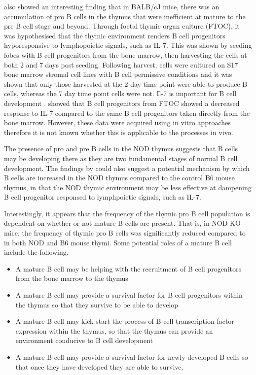 \citet{Hashimoto2002} also showed an interesting finding that in BALB/cJ mice, there was an accumulation of pro B cells in the thymus that were inefficient at mature to the pre B cell stage and beyond.
Through foetal thymic organ culture (FTOC), it was hypothesised that the thymic environment renders B cell progenitors hyporesponsive to lymphopoietic signals, such as IL-7.
This was shown by seeding lobes with B cell progenitors from the bone marrow, then harvesting the cells at both 2 and 7 days post seeding.
Following harvest, cells were cultured on S17 bone marrow stromal cell lines with B cell permissive conditions and it was shown that only those harvested at the 2 day time point were able to produce B cells, whereas the 7 day time point cells were not.
Il-7 is important for B cell development \citep{Corfe2012}. \citet{Hashimoto2002} showed that B cell progenitors from FTOC showed a decreased response to IL-7 compared to the same B cell progenitors taken directly from the bone marrow.
However, these data were acquired using in vitro approaches therefore it is not known whether this is applicable to the processes in vivo.

The presence of pro and pre B cells in the NOD thymus suggests that B cells may be developing there as they are two fundamental stages of normal B cell development.
The findings by \citet{Hashimoto2002} could also suggest a potential mechanism by which B cells are increased in the NOD thymus compared to the control B6 mouse thymus, in that the NOD thymic environment may be less effective at dampening B cell progenitor responsed to lymphpoietic signals, such as IL-7.

Interestingly, it appears that the frequency of the thymic pro B cell population is dependent on whether or not mature B cells are present.
That is, in NOD KO mice, the frequency of thymic pro B cells was significantly reduced compared to in both NOD and B6 mouse thymi.
Some potential roles of a mature B cell include the following.
\begin{itemize}
\item A mature B cell may be helping with the recruitment of B cell progenitors from the bone marrow to the thymus
\item A mature B cell may provide a survival factor for B cell progenitors within the thymus so that they survive to be able to develop
\item A mature B cell may kick start the process of B cell transcription factor expression within the thymus, so that the thymus can provide an environment conducive to B cell development
\item A mature B cell may provide a survival factor for newly developed B cells so that once they have developed they are able to survive.
\end{itemize}

